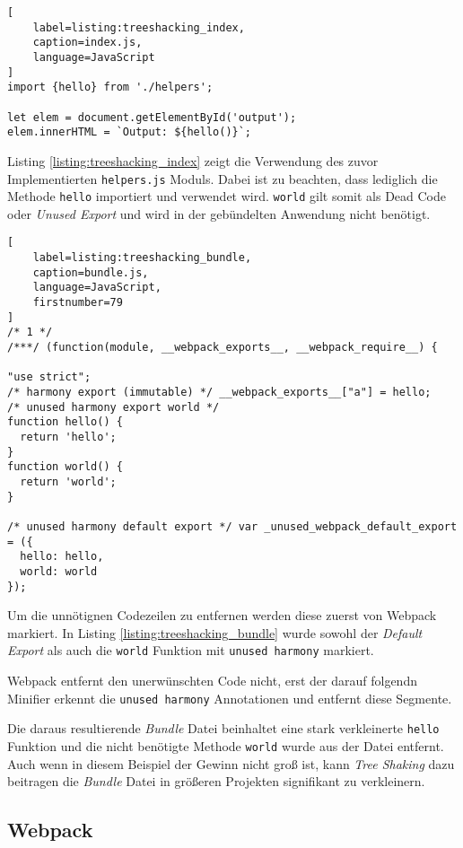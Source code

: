 \begin{lstlisting}[
    label=listing:treeshacking_index,
	caption=index.js,
	language=JavaScript
]
import {hello} from './helpers';

let elem = document.getElementById('output');
elem.innerHTML = `Output: ${hello()}`;
\end{lstlisting}

Listing \ref{listing:treeshacking_index} zeigt die Verwendung des zuvor Implementierten \lstinline{helpers.js} Moduls. Dabei ist zu beachten, dass lediglich die Methode \lstinline{hello} importiert und verwendet wird. \lstinline{world} gilt somit als Dead Code oder \textit{Unused Export }und wird in der gebündelten Anwendung nicht benötigt.

\begin{lstlisting}[
    label=listing:treeshacking_bundle,
	caption=bundle.js,
	language=JavaScript,
    firstnumber=79
]
/* 1 */
/***/ (function(module, __webpack_exports__, __webpack_require__) {

"use strict";
/* harmony export (immutable) */ __webpack_exports__["a"] = hello;
/* unused harmony export world */
function hello() {
  return 'hello';
}
function world() {
  return 'world';
}

/* unused harmony default export */ var _unused_webpack_default_export = ({
  hello: hello,
  world: world
});
\end{lstlisting}

Um die unnötignen Codezeilen zu entfernen werden diese zuerst von Webpack markiert. In Listing \ref{listing:treeshacking_bundle} wurde sowohl der \textit{Default Export} als auch die \lstinline{world} Funktion mit \lstinline{unused harmony} markiert.

Webpack entfernt den unerwünschten Code nicht, erst der darauf folgendn Minifier erkennt die \lstinline{unused harmony} Annotationen und entfernt diese Segmente.

Die daraus resultierende \textit{Bundle} Datei beinhaltet eine stark verkleinerte \lstinline{hello} Funktion und die nicht benötigte Methode \lstinline{world} wurde aus der Datei entfernt. Auch wenn in diesem Beispiel der Gewinn nicht groß ist, kann \textit{Tree Shaking} dazu beitragen die \textit{Bundle} Datei in größeren Projekten signifikant zu verkleinern.
\autocite{WebpackTreeShaking}

\subsection{Webpack}

